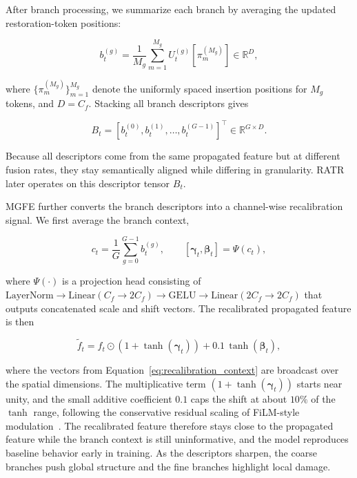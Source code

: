 \documentclass[symmetry,article,submit,pdftex,moreauthors]{Definitions/mdpi}
\begin{document}
After branch processing, we summarize each branch by averaging the updated restoration-token positions:

\begin{equation}
b_t^{(g)} =
\frac{1}{M_g}
\sum_{m=1}^{M_g}
U_t^{(g)}[\pi_m^{(M_g)}]
\in \mathbb{R}^{D},
\end{equation}

where $\{\pi_m^{(M_g)}\}_{m=1}^{M_g}$ denote the uniformly spaced insertion positions for $M_g$ tokens, and $D=C_f$. Stacking all branch descriptors gives

\begin{equation}
B_t =
\left[
b_t^{(0)}, b_t^{(1)}, \ldots, b_t^{(G-1)}
\right]^\top
\in \mathbb{R}^{G \times D}.
\end{equation}

Because all descriptors come from the same propagated feature but at different fusion rates, they stay semantically aligned while differing in granularity. RATR later operates on this descriptor tensor $B_t$.

MGFE further converts the branch descriptors into a channel-wise recalibration signal. We first average the branch context,

\begin{equation}
c_t = \frac{1}{G}\sum_{g=0}^{G-1}b_t^{(g)},
\qquad
[\boldsymbol{\gamma}_t,\boldsymbol{\beta}_t] = \Psi(c_t),
\label{eq:recalibration_context}
\end{equation}

where $\Psi(\cdot)$ is a projection head consisting of $\mathrm{LayerNorm}\!\rightarrow\!\mathrm{Linear}(C_f\!\rightarrow\!2C_f)\!\rightarrow\!\mathrm{GELU}\!\rightarrow\!\mathrm{Linear}(2C_f\!\rightarrow\!2C_f)$ that outputs concatenated scale and shift vectors. The recalibrated propagated feature is then

\begin{equation}
\widetilde{f}_t =
f_t \odot
\left(1+\tanh(\boldsymbol{\gamma}_t)\right)
+ 0.1\,\tanh(\boldsymbol{\beta}_t),
\label{eq:recalibration}
\end{equation}

where the vectors from Equation~\eqref{eq:recalibration_context} are broadcast over the spatial dimensions. The multiplicative term $(1+\tanh(\boldsymbol{\gamma}_t))$ starts near unity, and the small additive coefficient $0.1$ caps the shift at about $10\%$ of the $\tanh$ range, following the conservative residual scaling of FiLM-style modulation~\cite{perez2018film}. The recalibrated feature therefore stays close to the propagated feature while the branch context is still uninformative, and the model reproduces baseline behavior early in training. As the descriptors sharpen, the coarse branches push global structure and the fine branches highlight local damage.
\end{document}
